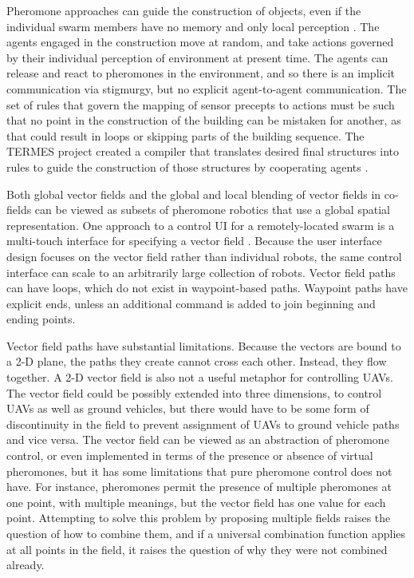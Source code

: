 Pheromone approaches can guide the construction of objects, even if the individual swarm members have no memory and only local perception \citep{mason2003programming}. 
The agents engaged in the construction move at random, and take actions governed by their individual perception of environment at present time. 
The agents can release and react to pheromones in the environment, and so there is an implicit communication via stigmurgy, but no explicit agent-to-agent communication. 
The set of rules that govern the mapping of sensor precepts to actions must be such that no point in the construction of the building can be mistaken for another, as that could result in loops or skipping parts of the building sequence. 
The TERMES project created a compiler that translates desired final structures into rules to guide the construction of those structures by cooperating agents \citep{werfel2014designing}.

Both global vector fields and the global and local blending of vector fields in co-fields can be viewed as subsets of pheromone robotics that use a global spatial representation. 
One approach to a control UI for a remotely-located swarm is a multi-touch interface for specifying a vector field \citep{Kato:2009:MIC:1520340.1520500}.
Because the user interface design focuses on the vector field rather than individual robots, the same control interface can scale to an arbitrarily large collection of robots. 
Vector field paths can have loops, which do not exist in waypoint-based paths. 
Waypoint paths have explicit ends, unless an additional command is added to join beginning and ending points. 

Vector field paths have substantial limitations. 
Because the vectors are bound to a 2-D plane, the paths they create cannot cross each other. 
Instead, they flow together. 
A 2-D vector field is also not a useful metaphor for controlling UAVs.
The vector field could be possibly extended into three dimensions, to control UAVs as well as ground vehicles, but there would have to be some form of discontinuity in the field to prevent assignment of UAVs to ground vehicle paths and vice versa. 
The vector field can be viewed as an abstraction of pheromone control, or even implemented in terms of the presence or absence of virtual pheromones, but it has some limitations that pure pheromone control does not have.
For instance, pheromones permit the presence of multiple pheromones at one point, with multiple meanings, but the vector field has one value for each point. 
Attempting to solve this problem by proposing multiple fields raises the question of how to combine them, and if a universal combination function applies at all points in the field, it raises the question of why they were not combined already. 

